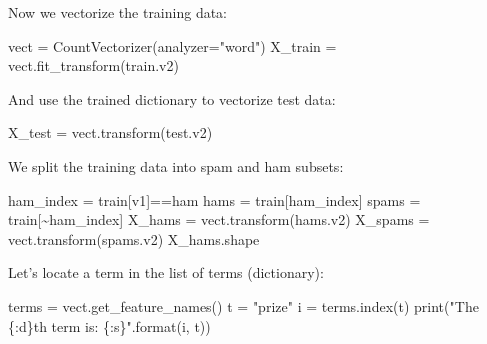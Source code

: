 \documentclass[
  letterpaper,
]{scrbook}
\newenvironment{Shaded}{\begin{snugshade}}{\end{snugshade}}
\newcommand{\BuiltInTok}[1]{\textcolor[rgb]{0.00,0.23,0.31}{#1}}
\newcommand{\NormalTok}[1]{\textcolor[rgb]{0.00,0.23,0.31}{#1}}
\newcommand{\OperatorTok}[1]{\textcolor[rgb]{0.37,0.37,0.37}{#1}}
\newcommand{\SpecialCharTok}[1]{\textcolor[rgb]{0.37,0.37,0.37}{#1}}
\newcommand{\StringTok}[1]{\textcolor[rgb]{0.13,0.47,0.30}{#1}}
\begin{document}
Now we vectorize the training data:

\begin{Shaded}
\begin{Highlighting}[]
\NormalTok{vect }\OperatorTok{=}\NormalTok{ CountVectorizer(analyzer}\OperatorTok{=}\StringTok{"word"}\NormalTok{)}
\NormalTok{X\_train }\OperatorTok{=}\NormalTok{ vect.fit\_transform(train.v2)}
\end{Highlighting}
\end{Shaded}

And use the trained dictionary to vectorize test data:

\begin{Shaded}
\begin{Highlighting}[]
\NormalTok{X\_test }\OperatorTok{=}\NormalTok{ vect.transform(test.v2)}
\end{Highlighting}
\end{Shaded}

We split the training data into spam and ham subsets:

\begin{Shaded}
\begin{Highlighting}[]
\NormalTok{ham\_index }\OperatorTok{=}\NormalTok{ train[}\StringTok{\textquotesingle{}v1\textquotesingle{}}\NormalTok{]}\OperatorTok{==}\StringTok{\textquotesingle{}ham\textquotesingle{}}
\NormalTok{hams }\OperatorTok{=}\NormalTok{ train[ham\_index]}
\NormalTok{spams }\OperatorTok{=}\NormalTok{ train[}\OperatorTok{\textasciitilde{}}\NormalTok{ham\_index]}
\NormalTok{X\_hams }\OperatorTok{=}\NormalTok{ vect.transform(hams.v2)}
\NormalTok{X\_spams }\OperatorTok{=}\NormalTok{ vect.transform(spams.v2)}
\NormalTok{X\_hams.shape}
\end{Highlighting}
\end{Shaded}

Let's locate a term in the list of terms (dictionary):

\begin{Shaded}
\begin{Highlighting}[]
\NormalTok{terms }\OperatorTok{=}\NormalTok{ vect.get\_feature\_names()}
\NormalTok{t }\OperatorTok{=} \StringTok{"prize"}
\NormalTok{i }\OperatorTok{=}\NormalTok{ terms.index(t)}
\BuiltInTok{print}\NormalTok{(}\StringTok{"The }\SpecialCharTok{\{:d\}}\StringTok{th term is: }\SpecialCharTok{\{:s\}}\StringTok{"}\NormalTok{.}\BuiltInTok{format}\NormalTok{(i, t))}
\end{Highlighting}
\end{Shaded}
\end{document}
